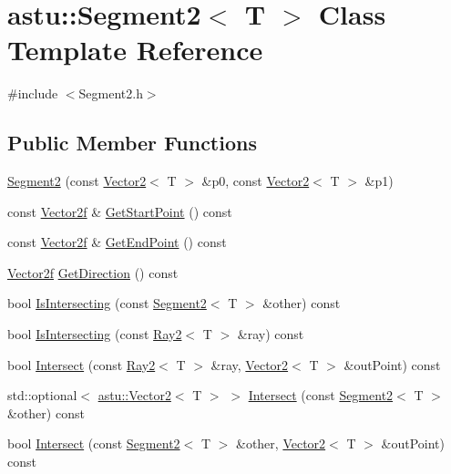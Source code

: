 \hypertarget{classastu_1_1Segment2}{}\section{astu\+:\+:Segment2$<$ T $>$ Class Template Reference}
\label{classastu_1_1Segment2}


{\ttfamily \#include $<$Segment2.\+h$>$}

\subsection*{Public Member Functions}
\begin{DoxyCompactItemize}
\item 
\hyperlink{classastu_1_1Segment2_a2636e676fc9c3f57d23d07759ee5c933}{Segment2} (const \hyperlink{classastu_1_1Vector2}{Vector2}$<$ T $>$ \&p0, const \hyperlink{classastu_1_1Vector2}{Vector2}$<$ T $>$ \&p1)
\item 
const \hyperlink{classastu_1_1Vector2}{Vector2f} \& \hyperlink{classastu_1_1Segment2_ae970169b80e29939c7f0b84b5b614435}{Get\+Start\+Point} () const
\item 
const \hyperlink{classastu_1_1Vector2}{Vector2f} \& \hyperlink{classastu_1_1Segment2_aa54a8ea0be86e591d593e5412ed6bc05}{Get\+End\+Point} () const
\item 
\hyperlink{classastu_1_1Vector2}{Vector2f} \hyperlink{classastu_1_1Segment2_a68bde513c070c248ddf69b1ebca1e7fc}{Get\+Direction} () const
\item 
bool \hyperlink{classastu_1_1Segment2_a88cf4a6cf9a15fe37fa5d43dd65267ed}{Is\+Intersecting} (const \hyperlink{classastu_1_1Segment2}{Segment2}$<$ T $>$ \&other) const
\item 
bool \hyperlink{classastu_1_1Segment2_a793214d60a3b15a08cfd505da4d24455}{Is\+Intersecting} (const \hyperlink{classastu_1_1Ray2}{Ray2}$<$ T $>$ \&ray) const
\item 
bool \hyperlink{classastu_1_1Segment2_a49888e46b2ea6005c60ecc95ff210cd2}{Intersect} (const \hyperlink{classastu_1_1Ray2}{Ray2}$<$ T $>$ \&ray, \hyperlink{classastu_1_1Vector2}{Vector2}$<$ T $>$ \&out\+Point) const
\item 
std\+::optional$<$ \hyperlink{classastu_1_1Vector2}{astu\+::\+Vector2}$<$ T $>$ $>$ \hyperlink{classastu_1_1Segment2_a6be10f8a94f6cfe66d37d8204d8a1123}{Intersect} (const \hyperlink{classastu_1_1Segment2}{Segment2}$<$ T $>$ \&other) const
\item 
bool \hyperlink{classastu_1_1Segment2_a302700a61530a0bbe07058917a28cf30}{Intersect} (const \hyperlink{classastu_1_1Segment2}{Segment2}$<$ T $>$ \&other, \hyperlink{classastu_1_1Vector2}{Vector2}$<$ T $>$ \&out\+Point) const
\end{DoxyCompactItemize}


